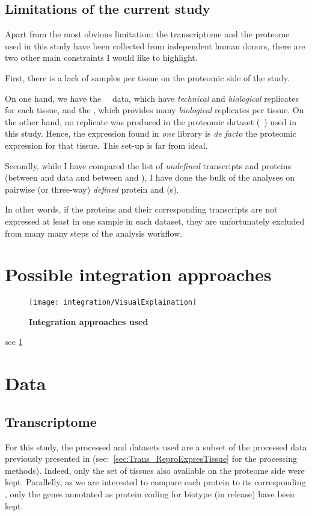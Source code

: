 \subsection{Limitations of the current study}
Apart from the most obvious limitation: the transcriptome and the proteome used in
this study have been collected from independent human donors, there are
two other main constraints I would like to highlight.

First, there is a lack of samples per tissue on the proteomic side of the study.

On one hand, we have the \uhlen\ \etal\ data, which have \emph{technical}
and \emph{biological} replicates for each tissue, and the \gtex, which
provides many \emph{biological} replicates per tissue. On the other hand, no
replicate was produced in the proteomic dataset (\pandey\ \etal) used
in this study. Hence, the expression found in \emph{one} library is
\textit{de facto} the proteomic expression for that tissue.
This set-up is far from ideal.

Secondly, while I have compared the list of \emph{undefined} transcripts and
proteins (between  and  data and
between  and ), I have done the bulk of the
analyses on pairwise (or three-way) \emph{defined} protein and \mRNA(s).

In other words, if the proteins and their corresponding transcripts are not
expressed at least in one sample in each dataset, they are unfortunately excluded
from many many steps of the analysis workflow.

\section{Possible integration approaches}
\label{sec:IntegrationPossibleApproaches}

\begin{figure}[!htbp]
    \texttt{[image: integration/VisualExplaination]}\centering
    \caption[Integration approaches used]{\label{fig:visualexp}\textbf{Integration
    approaches used}
    }
\end{figure}
see \cref{fig:visualexp}

\section{Data}
\label{sec:IntegrationData}

\subsection{Transcriptome}
For this study, the processed  and  datasets
used are a subset of the processed data previously presented in
 (see:~\cref{sec:Trans_ReproExpresTissue}
for the processing methods). Indeed, only the set of tissues also available
on the proteome side were kept. Parallelly, as we are interested to compare each
protein to its corresponding \mRNA, only the genes annotated as protein coding
for biotype (in  release) have been kept.

